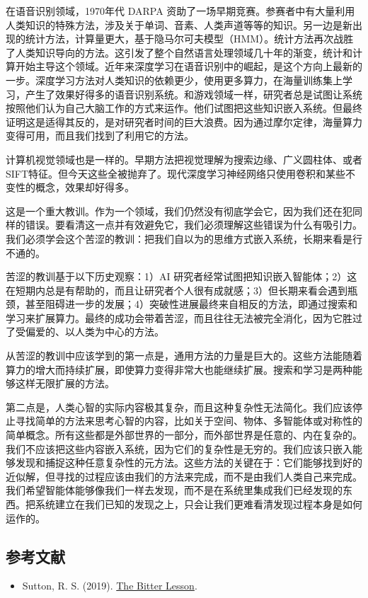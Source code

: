 在语音识别领域，1970年代 DARPA 资助了一场早期竞赛。参赛者中有大量利用人类知识的特殊方法，涉及关于单词、音素、人类声道等等的知识。另一边是新出现的统计方法，计算量更大，基于隐马尔可夫模型（HMM）。统计方法再次战胜了人类知识导向的方法。这引发了整个自然语言处理领域几十年的渐变，统计和计算开始主导这个领域。近年来深度学习在语音识别中的崛起，是这个方向上最新的一步。深度学习方法对人类知识的依赖更少，使用更多算力，在海量训练集上学习，产生了效果好得多的语音识别系统。和游戏领域一样，研究者总是试图让系统按照他们认为自己大脑工作的方式来运作。他们试图把这些知识嵌入系统。但最终证明这是适得其反的，是对研究者时间的巨大浪费。因为通过摩尔定律，海量算力变得可用，而且我们找到了利用它的方法。

计算机视觉领域也是一样的。早期方法把视觉理解为搜索边缘、广义圆柱体、或者SIFT特征。但今天这些全被抛弃了。现代深度学习神经网络只使用卷积和某些不变性的概念，效果却好得多。

这是一个重大教训。作为一个领域，我们仍然没有彻底学会它，因为我们还在犯同样的错误。要看清这一点并有效避免它，我们必须理解这些错误为什么有吸引力。我们必须学会这个苦涩的教训：把我们自以为的思维方式嵌入系统，长期来看是行不通的。

苦涩的教训基于以下历史观察：1）AI 研究者经常试图把知识嵌入智能体；2）这在短期内总是有帮助的，而且让研究者个人很有成就感；3）但长期来看会遇到瓶颈，甚至阻碍进一步的发展；4）突破性进展最终来自相反的方法，即通过搜索和学习来扩展算力。最终的成功会带着苦涩，而且往往无法被完全消化，因为它胜过了受偏爱的、以人类为中心的方法。

从苦涩的教训中应该学到的第一点是，通用方法的力量是巨大的。这些方法能随着算力的增大而持续扩展，即使算力变得非常大也能继续扩展。搜索和学习是两种能够这样无限扩展的方法。

第二点是，人类心智的实际内容极其复杂，而且这种复杂性无法简化。我们应该停止寻找简单的方法来思考心智的内容，比如关于空间、物体、多智能体或对称性的简单概念。所有这些都是外部世界的一部分，而外部世界是任意的、内在复杂的。我们不应该把这些内容嵌入系统，因为它们的复杂性是无穷的。我们应该只嵌入能够发现和捕捉这种任意复杂性的元方法。这些方法的关键在于：它们能够找到好的近似解，但寻找的过程应该由我们的方法来完成，而不是由我们人类自己来完成。我们希望智能体能够像我们一样去发现，而不是在系统里集成我们已经发现的东西。把系统建立在我们已知的发现之上，只会让我们更难看清发现过程本身是如何运作的。

\hypertarget{ux53c2ux8003ux6587ux732e-5}{%
\subsection{参考文献}\label{ux53c2ux8003ux6587ux732e-5}}

\vspace{0.25em}
\begin{itemize}
\tightlist
\item
  Sutton, R. S. (2019). \href{http://www.incompleteideas.net/IncIdeas/BitterLesson.html}{The Bitter Lesson}.
\end{itemize}

\clearpage
